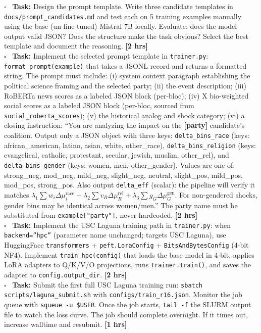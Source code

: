 \documentclass[11pt]{article}
\newcommand{\hrs}[1]{\textbf{[#1 hrs]}}
\newcommand{\task}[2]{%
  \noindent\textbf{Task:} #1 \hfill \hrs{#2}\\}
\newcommand{\done}{\textcolor{sectionblue}{$\square$}\ }
\begin{document}
\begin{taskbox}
\done \task{Design the prompt template. Write three candidate templates in
  \texttt{docs/prompt\_candidates.md} and test each on 5 training examples
  manually using the base (un-fine-tuned) Mistral 7B locally. Evaluate:
  does the model output valid JSON? Does the structure make the task obvious?
  Select the best template and document the reasoning.}{2}

\done \task{Implement the selected prompt template in \texttt{trainer.py}:
  \texttt{format\_prompt(example)} that takes a JSONL record and returns a
  formatted string. The prompt must include: (i) system context paragraph
  establishing the political science framing and the selected party; (ii) the
  event description; (iii) RoBERTa news scores as a labeled JSON block
  (per-bloc); (iv) X bio-weighted social scores as a labeled JSON block
  (per-bloc, sourced from \texttt{social\_roberta\_scores}); (v) the
  historical analog and shock category; (vi) a closing instruction:
  ``You are analyzing the impact on the \textbf{[party]} candidate's coalition.
  Output only a JSON object with three keys:
  \texttt{delta\_bins\_race} (keys: african\_american, latino, asian, white,
  other\_race), \texttt{delta\_bins\_religion} (keys: evangelical, catholic,
  protestant, secular, jewish, muslim, other\_rel), and
  \texttt{delta\_bins\_gender} (keys: women, men, other\_gender).
  Values are one of: strong\_neg, mod\_neg, mild\_neg, slight\_neg, neutral,
  slight\_pos, mild\_pos, mod\_pos, strong\_pos.
  Also output \texttt{delta\_eff} (scalar): the pipeline will verify it matches
  $\lambda_1\sum w_i\Delta\mu_i^{\text{race}} + \lambda_2\sum v_R\Delta\mu_R^{\text{rel}}
  + \lambda_3\sum g_G\Delta\mu_G^{\text{gen}}$.
  For non-gendered shocks, gender bins may be identical across women/men.''
  The party name must be substituted from \texttt{example["party"]}, never
  hardcoded.}{2}

\done \task{Implement the USC Laguna training path in \texttt{trainer.py}: when
  \texttt{backend=''hpc''} (parameter name unchanged; targets USC Laguna),
  use HuggingFace \texttt{transformers} +
  \texttt{peft.LoraConfig} + \texttt{BitsAndBytesConfig} (4-bit NF4).
  Implement \texttt{train\_hpc(config)} that loads the base model in 4-bit,
  applies LoRA adapters to Q/K/V/O projections, runs \texttt{Trainer.train()},
  and saves the adapter to \texttt{config.output\_dir}.}{2}

\done \task{Submit the first full USC Laguna training run: \texttt{sbatch
  scripts/laguna\_submit.sh} with \texttt{configs/train\_r16.json}.
  Monitor the job queue with \texttt{squeue -u \$USER}. Once the job starts,
  \texttt{tail -f} the SLURM output file to watch the loss curve.
  The job should complete overnight. If it times out, increase walltime and
  resubmit.}{1}


\end{taskbox}
\end{document}
